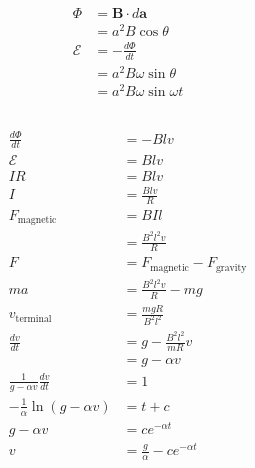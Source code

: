 \documentclass{article}
\renewcommand{\vec}[1]{\boldsymbol{\mathbf{#1}}}
\begin{document}
\begin{align*}
  \Phi        & = \vec{B} \cdot d \vec{a}    \\
              & = a^2 B \cos \theta          \\
  \mathcal{E} & = -\frac{d \Phi}{d t}        \\
              & = a^2 B \omega \sin \theta   \\
              & = a^2 B \omega \sin \omega t
\end{align*}

\subsection{}

\begin{align*}
  \frac{d \Phi}{d t}                     & = -B l v                                \\
  \mathcal{E}                            & = B l v                                 \\
  I R                                    & = B l v                                 \\
  I                                      & = \frac{B l v}{R}                       \\
  F_\text{magnetic}                      & = B I l                                 \\
                                         & = \frac{B^2 l^2 v}{R}                   \\
  F                                      & = F_\text{magnetic} - F_\text{gravity}  \\
  m a                                    & = \frac{B^2 l^2 v}{R} - m g             \\
  v_\text{terminal}                      & = \frac{m g R}{B^2 l^2}                 \\
  \frac{d v}{d t}                        & = g - \frac{B^2 l^2}{m R} v             \\
                                         & = g - \alpha v                          \\
  \frac{1}{g - \alpha v} \frac{d v}{d t} & = 1                                     \\
  -\frac{1}{\alpha} \ln (g - \alpha v)   & = t + c                                 \\
  g - \alpha v                           & = c e^{-\alpha t}                       \\
  v                                      & = \frac{g}{\alpha} - c e^{-\alpha t}    \\

\end{align*}
\end{document}
